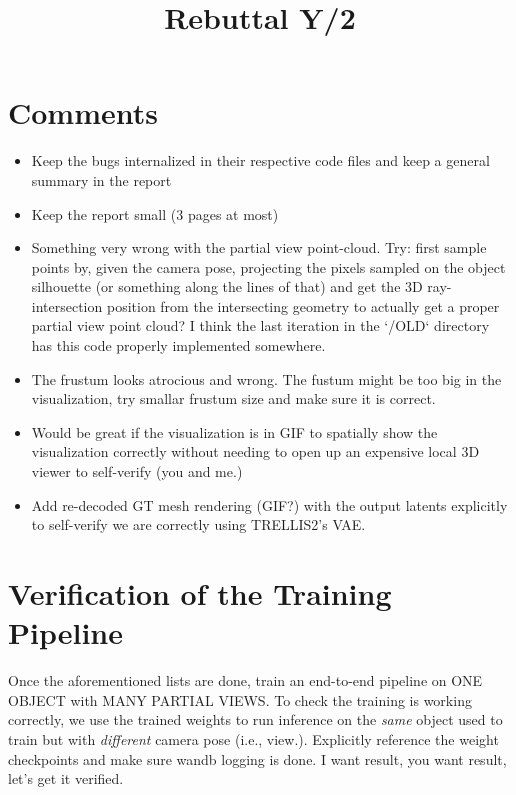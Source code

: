 \title{Rebuttal Y/2}

\maketitle

\section{Comments}

\begin{itemize}
    \item Keep the bugs internalized in their respective code files and keep a general summary in the report
    \item Keep the report small (3 pages at most)
    \item Something very wrong with the partial view point-cloud. Try: first sample points by, given the camera pose, projecting the pixels sampled on the object silhouette (or something along the lines of that) and get the 3D ray-intersection position from the intersecting geometry to actually get a proper partial view point cloud? I think the last iteration in the `/OLD` directory has this code properly implemented somewhere.
    \item The frustum looks atrocious and wrong. The fustum might be too big in the visualization, try smallar frustum size and make sure it is correct.
    \item Would be great if the visualization is in GIF to spatially show the visualization correctly without needing to open up an expensive local 3D viewer to self-verify (you and me.)
    \item Add re-decoded GT mesh rendering (GIF?) with the output latents explicitly to self-verify we are correctly using TRELLIS2's VAE.
\end{itemize}

\section{Verification of the Training Pipeline}

Once the aforementioned lists are done, train an end-to-end pipeline on ONE OBJECT with MANY PARTIAL VIEWS. To check the training is working correctly, we use the trained weights to run inference on the \textit{same} object used to train but with \textit{different} camera pose (i.e., view.). Explicitly reference the weight checkpoints and make sure wandb logging is done. I want result, you want result, let's get it verified.

